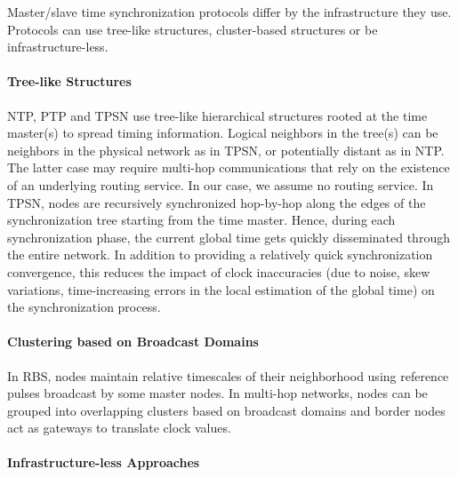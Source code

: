 Master/slave time synchronization protocols differ by the infrastructure they use. Protocols can use tree-like structures, cluster-based structures or be infrastructure-less.

\paragraph{Tree-like Structures}

NTP, PTP and TPSN use tree-like hierarchical structures rooted at the time master(s) to spread timing information. Logical neighbors in the tree(s) can be neighbors in the physical network as in TPSN, or potentially distant as in NTP. The latter case may require multi-hop communications that rely on the existence of an underlying routing service. In our case, we assume no routing service. In TPSN, nodes are recursively synchronized hop-by-hop along the edges of the synchronization tree starting from the time master. Hence, during each synchronization phase, the current global time gets quickly disseminated through the entire network. In addition to providing a relatively quick synchronization convergence, this reduces the impact of clock inaccuracies (due to noise, skew variations, time-increasing errors in the local estimation of the global time) on the synchronization process. 

\paragraph{Clustering based on Broadcast Domains} In RBS, nodes maintain relative timescales of their neighborhood using reference pulses broadcast by some master nodes. In multi-hop networks, nodes can be grouped into overlapping clusters based on broadcast domains and border nodes act as gateways to translate clock values. 

\paragraph{Infrastructure-less Approaches}

